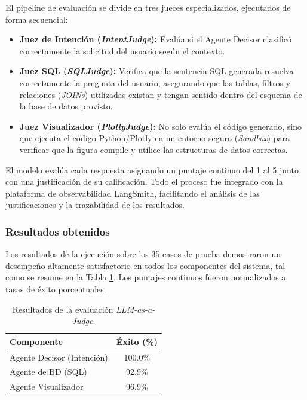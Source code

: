 El pipeline de evaluación se divide en tres jueces especializados, ejecutados de forma secuencial:
\begin{itemize}
      \item \textbf{Juez de Intención (\textit{IntentJudge}):} Evalúa si el Agente Decisor clasificó correctamente la solicitud del usuario según el contexto.
      \item \textbf{Juez SQL (\textit{SQLJudge}):} Verifica que la sentencia SQL generada resuelva correctamente la pregunta del usuario, asegurando que las tablas, filtros y relaciones (\textit{JOINs}) utilizadas existan y tengan sentido dentro del esquema de la base de datos provisto.
      \item \textbf{Juez Visualizador (\textit{PlotlyJudge}):} No solo evalúa el código generado, sino que ejecuta el código Python/Plotly en un entorno seguro (\textit{Sandbox}) para verificar que la figura compile y utilice las estructuras de datos correctas.
\end{itemize}

El modelo evalúa cada respuesta asignando un puntaje continuo del 1 al 5 junto con una justificación de su calificación. Todo el proceso fue integrado con la plataforma de observabilidad LangSmith, facilitando el análisis de las justificaciones y la trazabilidad de los resultados.

\subsubsection{Resultados obtenidos}

Los resultados de la ejecución sobre los 35 casos de prueba demostraron un desempeño altamente satisfactorio en todos los componentes del sistema, tal como se resume en la Tabla \ref{tab:resultados_eval}. Los puntajes continuos fueron normalizados a tasas de éxito porcentuales.

\begin{table}[H]
      \centering
      \begin{tabular}{lc}
            \hline
            \textbf{Componente}        & \textbf{Éxito (\%)} \\
            \hline
            Agente Decisor (Intención) & 100.0\%             \\
            Agente de BD (SQL)         & 92.9\%              \\
            Agente Visualizador        & 96.9\%              \\
            \hline
      \end{tabular}
      \caption{Resultados de la evaluación \textit{LLM-as-a-Judge}.}
      \label{tab:resultados_eval}
\end{table}


